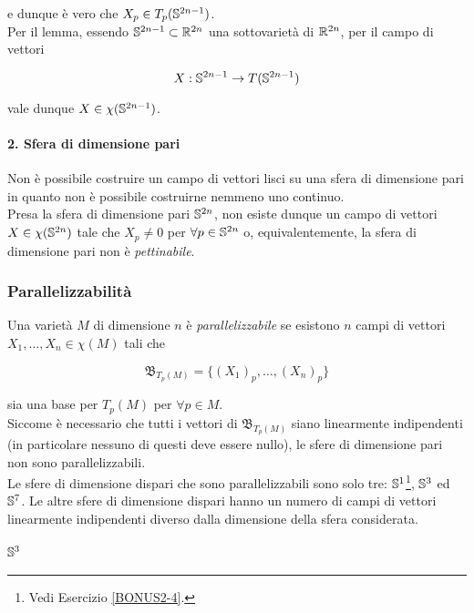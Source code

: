 e dunque è vero che $ X_{p} \in T_{p}(\S^{2n-1}) $.\\
Per il lemma, essendo $ \S^{2n-1} \subset \R^{2n} $ una sottovarietà di $ \R^{2n} $, per il campo di vettori

\begin{equation}
	X : \S^{2n-1} \to T(\S^{2n-1})
\end{equation}

vale dunque $ X \in \chi(\S^{2n-1}) $.

\paragraph{2. Sfera di dimensione pari}

Non è possibile costruire un campo di vettori lisci su una sfera di dimensione pari in quanto non è possibile costruirne nemmeno uno continuo.\\
Presa la sfera di dimensione pari $ \S^{2n} $, non esiste dunque un campo di vettori $ X \in \chi(\S^{2n}) $ tale che $ X_{p} \neq 0 $ per $ \forall p \in \S^{2n} $ o, equivalentemente, la sfera di dimensione pari non è \textit{pettinabile}.

\subsubsection{Parallelizzabilità}

Una varietà $ M $ di dimensione $ n $ è \textit{parallelizzabile} se esistono $ n $ campi di vettori $ X_{1},\dots,X_{n} \in \chi(M) $ tali che

\begin{equation}
	\mathfrak{B}_{T_{p}(M)} = \{ (X_{1})_{p},\dots,(X_{n})_{p} \}
\end{equation}

sia una base per $ T_{p}(M) $ per $ \forall p \in M $.\\
Siccome è necessario che tutti i vettori di $ \mathfrak{B}_{T_{p}(M)} $ siano linearmente indipendenti (in particolare nessuno di questi deve essere nullo), le sfere di dimensione pari non sono parallelizzabili.\\
Le sfere di dimensione dispari che sono parallelizzabili sono solo tre: $ \S^{1} $\footnote{%
	Vedi Esercizio \ref{BONUS2-4}.%
}, $ \S^{3} $ ed $ \S^{7} $. Le altre sfere di dimensione dispari hanno un numero di campi di vettori linearmente indipendenti diverso dalla dimensione della sfera considerata.

\paragraph{$ \S^{3} $}

